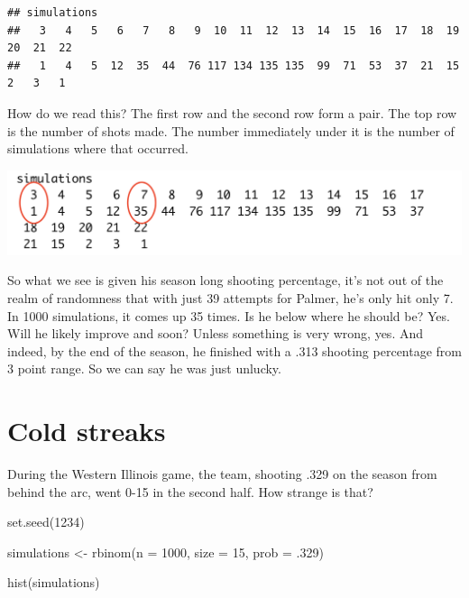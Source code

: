 \documentclass[
]{book}
\newenvironment{Shaded}{\begin{snugshade}}{\end{snugshade}}
\newcommand{\AttributeTok}[1]{\textcolor[rgb]{0.77,0.63,0.00}{#1}}
\newcommand{\DecValTok}[1]{\textcolor[rgb]{0.00,0.00,0.81}{#1}}
\newcommand{\FunctionTok}[1]{\textcolor[rgb]{0.00,0.00,0.00}{#1}}
\newcommand{\NormalTok}[1]{#1}
\newcommand{\OtherTok}[1]{\textcolor[rgb]{0.56,0.35,0.01}{#1}}
\begin{document}
\begin{verbatim}
## simulations
##   3   4   5   6   7   8   9  10  11  12  13  14  15  16  17  18  19  20  21  22 
##   1   4   5  12  35  44  76 117 134 135 135  99  71  53  37  21  15   2   3   1
\end{verbatim}

How do we read this? The first row and the second row form a pair. The top row is the number of shots made. The number immediately under it is the number of simulations where that occurred.

\includegraphics[width=23.06in]{images/simulations1}

So what we see is given his season long shooting percentage, it's not out of the realm of randomness that with just 39 attempts for Palmer, he's only hit only 7. In 1000 simulations, it comes up 35 times. Is he below where he should be? Yes. Will he likely improve and soon? Unless something is very wrong, yes. And indeed, by the end of the season, he finished with a .313 shooting percentage from 3 point range. So we can say he was just unlucky.

\hypertarget{cold-streaks}{%
\section{Cold streaks}\label{cold-streaks}}

During the Western Illinois game, the team, shooting .329 on the season from behind the arc, went 0-15 in the second half. How strange is that?

\begin{Shaded}
\begin{Highlighting}[]
\FunctionTok{set.seed}\NormalTok{(}\DecValTok{1234}\NormalTok{)}

\NormalTok{simulations }\OtherTok{\textless{}{-}} \FunctionTok{rbinom}\NormalTok{(}\AttributeTok{n =} \DecValTok{1000}\NormalTok{, }\AttributeTok{size =} \DecValTok{15}\NormalTok{, }\AttributeTok{prob =}\NormalTok{ .}\DecValTok{329}\NormalTok{)}

\FunctionTok{hist}\NormalTok{(simulations)}
\end{Highlighting}
\end{Shaded}
\end{document}
